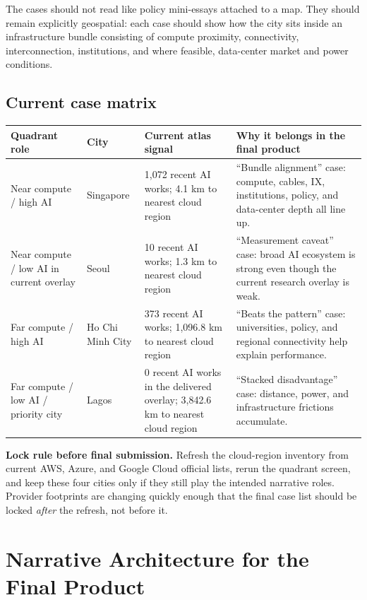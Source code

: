\documentclass[11pt]{article}
\begin{document}
\noindent The cases should not read like policy mini-essays attached to a map. They should remain explicitly geospatial: each case should show how the city sits inside an infrastructure bundle consisting of compute proximity, connectivity, interconnection, institutions, and where feasible, data-center market and power conditions.

\subsection{Current case matrix}

\begin{center}
\begin{tabularx}{\textwidth}{P{0.2\textwidth} P{0.14\textwidth} P{0.2\textwidth} Y}
\toprule
\textbf{Quadrant role} & \textbf{City} & \textbf{Current atlas signal} & \textbf{Why it belongs in the final product} \\
\midrule
Near compute / high AI & Singapore & 1{,}072 recent AI works; 4.1 km to nearest cloud region & ``Bundle alignment'' case: compute, cables, IX, institutions, policy, and data-center depth all line up. \\
Near compute / low AI in current overlay & Seoul & 10 recent AI works; 1.3 km to nearest cloud region & ``Measurement caveat'' case: broad AI ecosystem is strong even though the current research overlay is weak. \\
Far compute / high AI & Ho Chi Minh City & 373 recent AI works; 1{,}096.8 km to nearest cloud region & ``Beats the pattern'' case: universities, policy, and regional connectivity help explain performance. \\
Far compute / low AI / priority city & Lagos & 0 recent AI works in the delivered overlay; 3{,}842.6 km to nearest cloud region & ``Stacked disadvantage'' case: distance, power, and infrastructure frictions accumulate. \\
\bottomrule
\end{tabularx}
\end{center}

\noindent\textbf{Lock rule before final submission.} Refresh the cloud-region inventory from current AWS, Azure, and Google Cloud official lists, rerun the quadrant screen, and keep these four cities only if they still play the intended narrative roles. Provider footprints are changing quickly enough that the final case list should be locked \emph{after} the refresh, not before it.

\section{Narrative Architecture for the Final Product}
\end{document}

